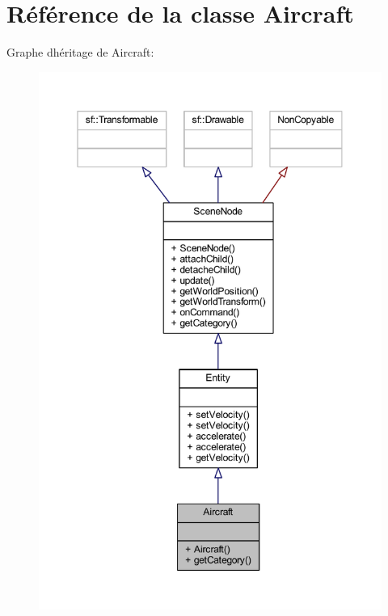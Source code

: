 \hypertarget{class_aircraft}{}\section{Référence de la classe Aircraft}
\label{class_aircraft}


Graphe d\textquotesingle{}héritage de Aircraft\+:\nopagebreak
\begin{figure}[H]
\begin{center}
\leavevmode
\includegraphics[width=350pt]{class_aircraft__inherit__graph}
\end{center}
\end{figure}


